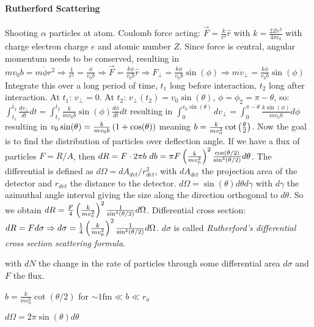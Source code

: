 \paragraph{Rutherford Scattering}
Shooting $\alpha$ particles at atom. Coulomb force acting:
$\vec{F} = \frac{k}{r^2} \hat{r}$ with $k = \frac{2 Z e^2}{4 \pi \epsilon_0}$
with charge electron charge $e$ and atomic number $Z$. Since force is central,
angular momentum needs to be conserved, resulting in $m v_0 b = m \dot{\phi} r^2
\Rightarrow \frac{1}{r^2} = \frac{\dot{\phi}}{v_0 b} \Rightarrow \vec{F} =
\frac{k \dot{\phi}}{v_0 b} \hat{r} \Rightarrow F_{\perp} = \frac{k \dot{\phi}}{v_0 b}
\sin(\phi) \Rightarrow m \dot{v}_{\perp} = \frac{k \dot{\phi}}{v_0 b} \sin(\phi)$
Integrate this over a long period of time, $t_1$ long before interaction,
$t_2$ long after interaction. At $t_1$: $v_\perp = 0$. At $t_2$:
$v_\perp (t_2) = v_0 \sin(\theta)$, $\phi = \phi_2 = \pi - \theta$, so:
$\int_{t_1}^{t_2} \frac{d v_\perp}{dt} dt = \int_{t_1}^{t_2} \frac{k}{m v_0 b} \sin(\phi) \frac{d \phi}{dt} dt$
resulting in $\int_0^{v_0 \sin(\theta)} d v_\perp = \int_0^{\pi-\theta} \frac{k \sin(\phi)}{m v_0 b} d \phi$
resulting in $v_0 \sin(\theta) = \frac{k}{m v_0 b} \left( 1 + \cos(\theta) \right)$
meaning $b = \frac{k}{m v_0^2} \cot \left( \frac{\theta}{2} \right)$.
Now the goal is to find the distribution of particles over deflection angle.
If we have a flux of particles $F = R/A$, then $d R = F \cdot 2 \pi b \ db
= \pi F \left( \frac{k}{m v_0^2} \right)^2 \frac{\cos(\theta/2)}{\sin^3(\theta/2)} d \theta$.
The differential  is defined as $d \Omega = d A_{det} / r_{det}^2$,
with $d A_{det}$ the projection area of the detector and $r_{det}$ the distance
to the detector. $d \Omega = \sin(\theta) d \theta d \gamma$ with $d \gamma$ the
azimuthal angle interval giving the size along the direction orthogonal to $d \theta$.
So we obtain $d R = \frac{F}{4} \left( \frac{k}{m v_0^2} \right)^2 \frac{1}{\sin^4(\theta/2)} d \Omega$.
Differential cross section: $d R = F d \sigma \Rightarrow d \sigma =
\frac{1}{4} \left( \frac{k}{m v_0^2} \right)^2 \frac{1}{\sin^4(\theta/2)} d \Omega$.
$d \sigma$ is called \textit{Rutherford's differential cross section scattering
formula}.

\vspace{1\baselineskip}

 with $dN$ the change in the rate of particles
through some differential area $d \sigma$ and $F$ the flux.

\vspace{1\baselineskip}

$b = \frac{k}{m v_0^2} \cot(\theta/2)$ for $ \sim 1 \mathrm{fm} \ll b \ll r_a$

\vspace{1\baselineskip}

$d \Omega = 2 \pi \sin(\theta) d \theta$
